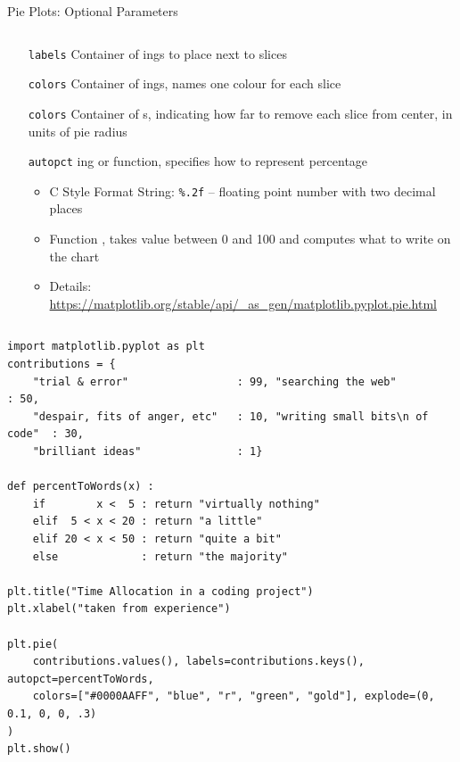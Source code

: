 \begin{frame}[fragile]{Pie Plots: Optional Parameters}
%
\begin{columns}
\begin{center}
\begin{itemize}
\item[\texttt{labels}] Container of ings to place next to slices
\item[\texttt{colors}] Container of ings, names one colour for each slice
\item[\texttt{colors}] Container of s, indicating how far to remove each slice from center, in units of pie radius
\item[\texttt{autopct}] ing or function, specifies how to represent percentage
	\begin{itemize}
	\item C Style Format String: \texttt{\%.2f} -- floating point number with two decimal places
	\item Function  \thus {}, takes value between 0 and 100 and computes what to write on the chart
	\item Details: \url{https://matplotlib.org/stable/api/_as_gen/matplotlib.pyplot.pie.html}
	\end{itemize}
\end{itemize}
\end{center}
\end{columns}
%
\end{frame}


\begin{frame}[fragile]
%
\vspace{-7pt}
\begin{codebox}
\begin{verbatim}
import matplotlib.pyplot as plt
contributions = {
    "trial & error"                 : 99, "searching the web"             : 50,
    "despair, fits of anger, etc"   : 10, "writing small bits\n of code"  : 30,
    "brilliant ideas"               : 1}

def percentToWords(x) :
    if        x <  5 : return "virtually nothing"
    elif  5 < x < 20 : return "a little"
    elif 20 < x < 50 : return "quite a bit"
    else             : return "the majority"

plt.title("Time Allocation in a coding project")
plt.xlabel("taken from experience")

plt.pie(
    contributions.values(), labels=contributions.keys(), autopct=percentToWords,
    colors=["#0000AAFF", "blue", "r", "green", "gold"], explode=(0, 0.1, 0, 0, .3)
)
plt.show()
\end{verbatim}
\end{codebox}
%
\end{frame}

